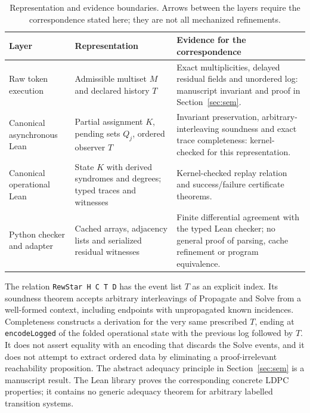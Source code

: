 \begin{table}[t]
\centering\small
\caption{Representation and evidence boundaries. Arrows between the
layers require the correspondence stated here; they are not all
mechanized refinements.}
\label{tab:representation-boundary}
\begin{tabular}{>{\raggedright\arraybackslash}p{}>{\raggedright\arraybackslash}p{}>{\raggedright\arraybackslash}p{}}
\toprule
Layer & Representation & Evidence for the correspondence \\
\midrule
Raw token execution & Admissible multiset $M$ and declared history $T$ &
Exact multiplicities, delayed residual fields and unordered log:
manuscript invariant and proof in Section~\ref{sec:sem}. \\
Canonical asynchronous Lean & Partial assignment $K$, pending sets $Q_j$,
ordered observer $T$ &
Invariant preservation, arbitrary-interleaving soundness and exact
trace completeness: kernel-checked for this representation. \\
Canonical operational Lean & State $K$ with derived syndromes and degrees;
typed traces and witnesses &
Kernel-checked replay relation and success/failure certificate theorems. \\
Python checker and adapter & Cached arrays, adjacency lists and serialized
residual witnesses &
Finite differential agreement with the typed Lean checker; no general
proof of parsing, cache refinement or program equivalence. \\
\bottomrule
\end{tabular}
\end{table}

The relation \texttt{RewStar H C T D} has the event list $T$ as an
explicit index. Its soundness theorem accepts arbitrary interleavings
of Propagate and Solve from a well-formed context, including endpoints
with unpropagated known incidences. Completeness constructs a derivation
for the very same prescribed $T$, ending at
\texttt{encodeLogged} of the folded operational state with the previous
log followed by $T$. It does not assert equality with an encoding that
discards the Solve events, and it does not attempt to extract ordered
data by eliminating a proof-irrelevant reachability proposition.
The abstract adequacy principle in Section~\ref{sec:sem} is a manuscript
result. The Lean library proves the corresponding concrete LDPC
properties; it contains no generic adequacy theorem for arbitrary
labelled transition systems.

